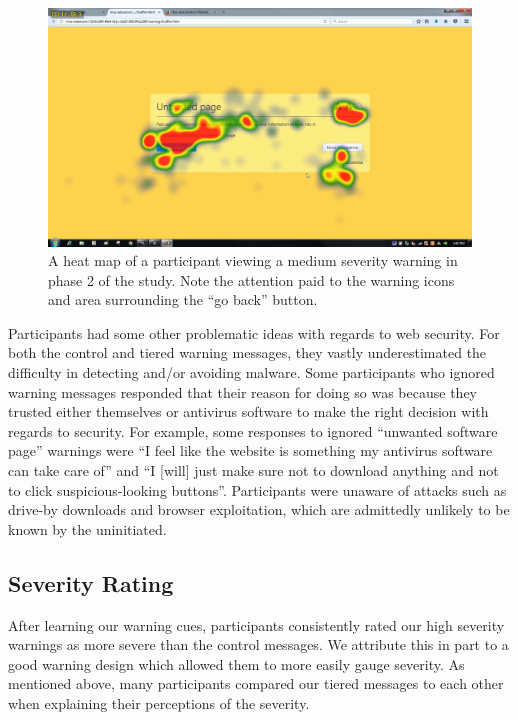\begin{figure}[!htb]
	\centering
	\includegraphics[width=\textwidth]{Figures/Heat-Map-P2-Medium}
	\decoRule
	\caption[Phase 2 example heatmap]{A heat map of a participant viewing a medium severity warning in phase 2 of the study. Note the attention paid to the warning icons and area surrounding the ``go back'' button.}
	\label{fig:Heatmap-Phase2}
\end{figure}

Participants had some other problematic ideas with regards to web security. For both the control and tiered warning messages, they vastly underestimated the difficulty in detecting and/or avoiding malware. Some participants who ignored warning messages responded that their reason for doing so was because they trusted either themselves or antivirus software to make the right decision with regards to security. For example, some responses to ignored ``unwanted software page'' warnings were ``I feel like the website is something my antivirus software can take care of'' and ``I [will] just make sure not to download anything and not to click suspicious-looking buttons''. Participants were unaware of attacks such as drive-by downloads and browser exploitation, which are admittedly unlikely to be known by the uninitiated.

\subsection{Severity Rating}
After learning our warning cues, participants consistently rated our high severity warnings as more severe than the control messages. We attribute this in part to a good warning design which allowed them to more easily gauge severity. As mentioned above, many participants compared our tiered messages to each other when explaining their perceptions of the severity.

